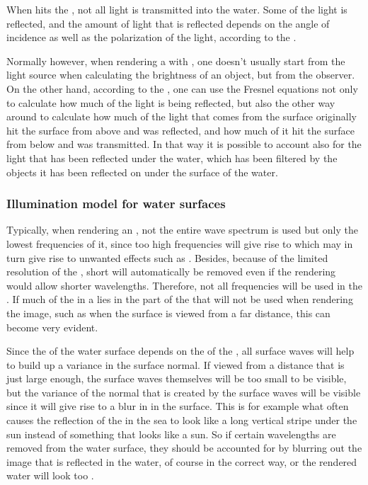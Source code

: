When \light hits the , not all light is transmitted into the water. Some of the light is reflected, and the amount of light that is reflected depends on the angle of incidence as well as the polarization of the light, according to the .

Normally however, when rendering a \scene with , one doesn't usually start from the light source when calculating the brightness of an object, but from the observer. On the other hand, according to the , one can use the Fresnel equations not only to calculate how much of the light is being reflected, but also the other way around to calculate how much of the light that comes from the surface originally hit the surface from above and was reflected, and how much of it hit the surface from below and was transmitted. In that way it is possible to account also for the light that has been reflected under the water, which has been filtered by the objects it has been reflected on under the surface of the water.

\subsubsection{Illumination model for water surfaces}

Typically, when rendering an , not the entire wave spectrum is used but only the lowest frequencies of it, since too high frequencies will give rise to \folding which may in turn give rise to unwanted effects such as . Besides, because of the limited resolution of the \grid, short \wavelengths will automatically be removed even if the rendering would allow shorter wavelengths. Therefore, not all frequencies will be used in the . If much of the  in a  lies in the part of the  that will not be used when rendering the image, such as when the surface is viewed from a far distance, this can become very evident.

Since the  of the water surface depends on the \gradient of the , all surface waves will help to build up a variance in the surface normal. If viewed from a distance that is just large enough, the surface waves themselves will be too small to be visible, but the variance of the normal that is created by the surface waves will be visible since it will give rise to a blur in  in the surface. This is for example what often causes the reflection of the \sun in the sea to look like a long vertical stripe under the sun instead of something that looks like a sun. So if certain wavelengths are removed from the water surface, they should be accounted for by blurring out the image that is reflected in the water, of course in the correct way, or the rendered water will look too \smooth.

